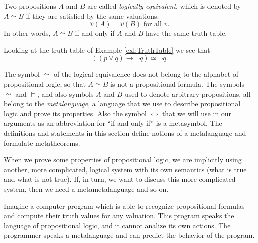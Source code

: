 \begin{page}
\setcounter{section}{1}
\setcounter{subsection}{3}
\setcounter{dfn}{7}
\label{portion:371}

\begin{dfn}
\label{dfn:LogEqProp}
Two propositions $A$ and $B$ are called \emph{logically equivalent}, which is denoted by $A \simeq B$ if they are satisfied by the same valuations:
\[
\hat{v}(A) = \hat{v}(B) \text{ for all }v.
\]
In other words, $A \simeq B$ if and only if $A$ and $B$ have the same truth table.
\end{dfn}

\end{page}

\begin{page}
\setcounter{section}{1}
\setcounter{subsection}{3}
\setcounter{dfn}{8}
\label{portion:374}

\begin{exl}
Looking at the truth table of Example \ref{exl:TruthTable} we see that
\[
((p \vee q) \to \neg q) \simeq \neg q.
\]
\end{exl}

\end{page}

\begin{page}
\setcounter{section}{1}
\setcounter{subsection}{3}
\setcounter{dfn}{9}
\label{portion:377}

\begin{rem}
The symbol $\simeq$ of the logical equivalence does not belong to the alphabet of propositional logic, so that $A \simeq B$ is not a propositional formula.
The symbols $\simeq$ and $\vDash$, and also symbols $A$ and $B$ used to denote arbitrary propositions,
all belong to the \emph{metalanguage}, a language that we use to describe propositional logic and prove its properties.
Also the symbol $\Leftrightarrow$ that we will use in our arguments as an abbreviation for ``if and only if'' is a metasymbol.
The definitions and statements in this section define notions of a metalanguage and formulate metatheorems.

When we prove some properties of propositional logic,
we are implicitly using another, more complicated, logical system with its own semantics (what is true and what is not true).
If, in turn, we want to discuss this more complicated system, then we need a metametalanguage and so on.

Imagine a computer program which is able to recognize propositional formulas and compute their truth values for any valuation.
This program speaks the language of propositional logic, and it cannot analize its own actions.
The programmer speaks a metalanguage and can predict the behavior of the program.
\end{rem}

\end{page}

